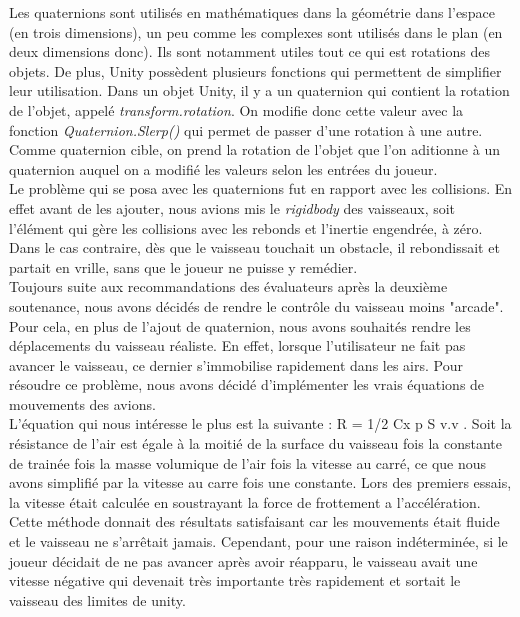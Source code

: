 \documentclass[12pt, titlepage]{article}
\begin{document}
\begin{spacing}{1.5}
Les quaternions sont utilisés en mathématiques dans la géométrie dans l'espace (en trois dimensions), un peu comme les complexes sont utilisés dans le plan (en deux dimensions donc). Ils sont notamment utiles tout ce qui est rotations des objets. De plus, Unity possèdent plusieurs fonctions qui permettent de simplifier leur utilisation. Dans un objet Unity, il y a un quaternion qui contient la rotation de l'objet, appelé \textit{transform.rotation}. On modifie donc cette valeur avec la fonction \textit{Quaternion.Slerp()} qui permet de passer d'une rotation à une autre. Comme quaternion cible, on prend la rotation de l'objet que l'on aditionne à un quaternion auquel on a modifié les valeurs selon les entrées du joueur.\\

Le problème qui se posa avec les quaternions fut en rapport avec les collisions. En effet avant de les ajouter, nous avions mis le \textit{rigidbody} des vaisseaux, soit l'élément qui gère les collisions avec les rebonds et l'inertie engendrée, à zéro. Dans le cas contraire, dès que le vaisseau touchait un obstacle, il rebondissait et partait en vrille, sans que le joueur ne puisse y remédier.\\

Toujours suite aux recommandations des évaluateurs après la deuxième soutenance, nous avons décidés de rendre le contrôle du vaisseau moins "arcade". Pour cela, en plus de l'ajout de quaternion, nous avons souhaités rendre les déplacements du vaisseau réaliste. En effet, lorsque l'utilisateur ne fait pas avancer le vaisseau, ce dernier s'immobilise rapidement dans les airs. Pour résoudre ce problème, nous avons décidé d'implémenter les vrais équations de mouvements des avions.\\

L'équation qui nous intéresse le plus est la suivante : R = 1/2 Cx p S v.v . Soit la résistance de l'air est égale à la moitié de la surface du vaisseau fois la constante de trainée fois la masse volumique de l'air fois la vitesse au carré, ce que nous avons simplifié par la vitesse au carre fois une constante. Lors des premiers essais, la vitesse était calculée en soustrayant la force de frottement a l'accélération. Cette méthode donnait des résultats satisfaisant car les mouvements était fluide et le vaisseau ne s'arrêtait jamais. Cependant, pour une raison indéterminée, si le joueur décidait de ne pas avancer après avoir réapparu, le vaisseau avait une vitesse négative qui devenait très importante très rapidement et sortait le vaisseau des limites de unity. \\


\end{spacing}
\end{document}
